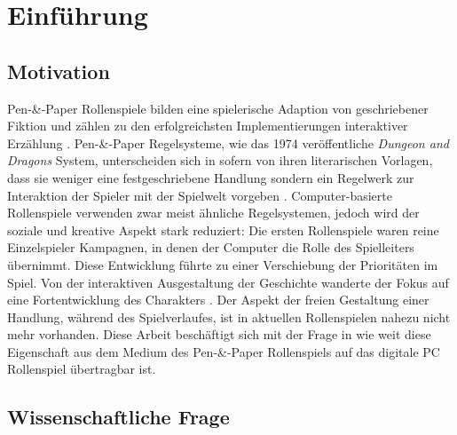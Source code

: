 \chapter{Einführung}


\section{Motivation}
\label{sec:Motivation}

Pen-\&-Paper Rollenspiele bilden eine spielerische Adaption von geschriebener Fiktion und zählen zu den erfolgreichsten Implementierungen interaktiver Erzählung \cite{Tychsen2006}. Pen-\&-Paper Regelsysteme, wie das 1974 veröffentliche \emph{Dungeon and Dragons} System, unterscheiden sich in sofern von ihren literarischen Vorlagen, dass sie weniger eine festgeschriebene Handlung sondern ein Regelwerk zur Interaktion der Spieler mit der Spielwelt vorgeben \cite{Apperley2006}. Computer-basierte Rollenspiele verwenden zwar meist ähnliche Regelsystemen, jedoch wird der soziale und kreative Aspekt stark reduziert: Die ersten Rollenspiele waren reine Einzelspieler Kampagnen, in denen der Computer die Rolle des Spielleiters übernimmt\cite{Apperley2006}. Diese Entwicklung führte zu einer Verschiebung der Prioritäten im Spiel. Von der interaktiven Ausgestaltung der Geschichte wanderte der Fokus auf eine Fortentwicklung des Charakters . Der Aspekt der freien Gestaltung einer Handlung, während des Spielverlaufes, ist in aktuellen Rollenspielen nahezu nicht mehr vorhanden. Diese Arbeit beschäftigt sich mit der Frage in wie weit diese Eigenschaft aus dem Medium des Pen-\&-Paper Rollenspiels auf das digitale PC Rollenspiel übertragbar ist.

\section{Wissenschaftliche Frage}
\label{sec:WissenschaftlicheFrage}

